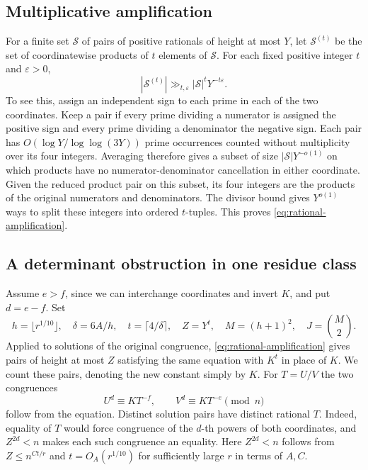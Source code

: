 \documentclass[11pt,reqno]{amsart}
\newcommand{\eps}{\varepsilon}
\begin{document}
\subsection{Multiplicative amplification}
For a finite set \(\mathcal S\) of pairs of positive rationals
of height at most \(Y\), let \(\mathcal S^{(t)}\) be the set of
coordinatewise products of \(t\) elements of \(\mathcal S\).
For each fixed positive integer \(t\) and \(\eps>0\),
\begin{equation}\label{eq:rational-amplification}
               |\mathcal S^{(t)}|\gg_{t,\eps}|\mathcal S|^t Y^{-t\eps}.
\end{equation}
To see this, assign an independent sign to each prime in each
of the two coordinates. Keep a pair if every prime dividing a
numerator is assigned the positive sign and every prime dividing
a denominator the negative sign. Each pair has
\(O(\log Y/\log\log(3Y))\) prime occurrences counted without
multiplicity over its four integers. Averaging therefore gives
a subset of size \(|\mathcal S|Y^{-o(1)}\) on which products
have no numerator-denominator cancellation in either coordinate.
Given the reduced product pair on this subset, its four integers
are the products of the original numerators and denominators.
The divisor bound gives \(Y^{o(1)}\) ways to split these integers
into ordered \(t\)-tuples. This proves \eqref{eq:rational-amplification}.

\subsection{A determinant obstruction in one residue class}
Assume \(e>f\), since we can interchange coordinates and invert
\(K\), and put \(d=e-f\). Set
\[
 h=\lfloor r^{1/10}\rfloor,\quad
 \delta=6A/h,\quad t=\lceil 4/\delta\rceil,\quad
 Z=Y^t,\quad M=(h+1)^2,\quad J=\binom M2 .
\]
Applied to solutions of the original congruence,
\eqref{eq:rational-amplification} gives pairs of height at most
\(Z\) satisfying the same equation with \(K^t\) in place of \(K\).
We count these pairs, denoting the new constant simply by \(K\).
For \(T=U/V\) the two congruences
\[
                    U^d\equiv K T^{-f},\qquad V^d\equiv K T^{-e}
                       \pmod n
\]
follow from the equation. Distinct solution pairs have distinct
rational \(T\). Indeed, equality of \(T\) would force congruence of
the \(d\)-th powers of both coordinates, and \(Z^{2d}<n\) makes
each such congruence an equality. Here \(Z^{2d}<n\) follows
from \(Z\le n^{Ct/r}\) and \(t=O_A(r^{1/10})\)
for sufficiently large \(r\) in terms of \(A,C\).
\end{document}
